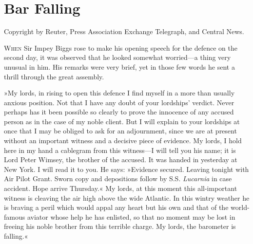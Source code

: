
\chapter{Bar Falling}

\epigraph{Copyright by Reuter, Press Association Exchange Telegraph, and Central News.}{}


\lettrine[lines=4]{W}{hen} Sir Impey Biggs rose to make his opening speech for the defence on the second day, it was observed that he looked somewhat worried\allowbreak---\allowbreak a thing very unusual in him. His remarks were very brief, yet in those few words he sent a thrill through the great assembly.

»My lords, in rising to open this defence I find myself in a more than usually anxious position. Not that I have any doubt of your lordships' verdict. Never perhaps has it been possible so clearly to prove the innocence of any accused person as in the case of my noble client. But I will explain to your lordships at once that I may be obliged to ask for an adjournment, since we are at present without an important witness and a decisive piece of evidence. My lords, I hold here in my hand a cablegram from this witness\allowbreak---\allowbreak I will tell you his name; it is Lord Peter Wimsey, the brother of the accused. It was handed in yesterday at New York. I will read it to you. He says: »Evidence secured. Leaving tonight with Air Pilot Grant. Sworn copy and depositions follow by S.S. \textit{Lucarnia} in case accident. Hope arrive Thursday.« My lords, at this moment this all-important witness is cleaving the air high above the wide Atlantic. In this wintry weather he is braving a peril which would appal any heart but his own and that of the world-famous aviator whose help he has enlisted, so that no moment may be lost in freeing his noble brother from this terrible charge. My lords, the barometer is falling.«

